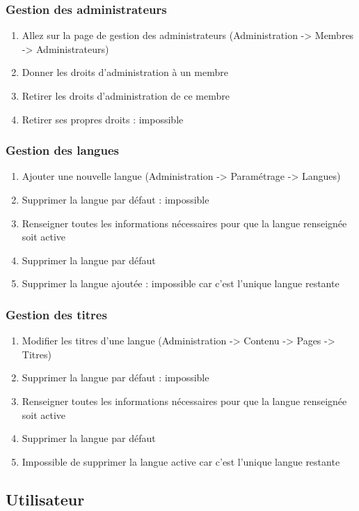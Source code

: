 \documentclass[11pt]{report}
\begin{document}
\subsubsection*{Gestion des administrateurs}
\begin{enumerate}
\item Allez sur la page de gestion des administrateurs (Administration -> 
Membres -> Administrateurs)
\item Donner les droits d’administration à un membre
\item Retirer les droits d’administration de ce membre
\item Retirer ses propres droits : impossible
\end{enumerate}

\subsubsection*{Gestion des langues}
\begin{enumerate}
\item Ajouter une nouvelle langue (Administration -> Paramétrage -> Langues)
\item Supprimer la langue par défaut : impossible
\item Renseigner toutes les informations nécessaires pour que la langue 
renseignée soit active
\item Supprimer la langue par défaut
\item Supprimer la langue ajoutée : impossible car c'est l'unique langue 
restante
\end{enumerate}

\subsubsection*{Gestion des titres}
\begin{enumerate}
\item Modifier les titres d'une langue (Administration -> Contenu -> Pages -> 
Titres)
\item Supprimer la langue par défaut : impossible
\item Renseigner toutes les informations nécessaires pour que la langue 
renseignée soit active
\item Supprimer la langue par défaut
\item Impossible de supprimer la langue active car c'est l'unique langue 
restante
\end{enumerate}

\subsection{Utilisateur}
\end{document}

